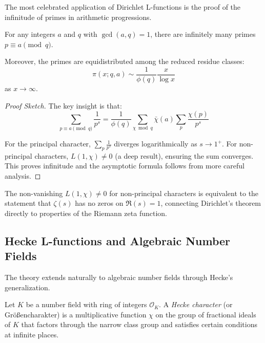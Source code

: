 The most celebrated application of Dirichlet L-functions is the proof of the infinitude of primes in arithmetic progressions.

\begin{theorem}
For any integers $a$ and $q$ with $\gcd(a,q) = 1$, there are infinitely many primes $p \equiv a \pmod{q}$.

Moreover, the primes are equidistributed among the reduced residue classes:
\begin{equation}
\pi(x; q, a) \sim \frac{1}{\phi(q)} \frac{x}{\log x}
\end{equation}
as $x \to \infty$.
\end{theorem}

\begin{proof}[Proof Sketch]
The key insight is that:
\begin{equation}
\sum_{p \equiv a \pmod{q}} \frac{1}{p^s} = \frac{1}{\phi(q)} \sum_{\chi \bmod q} \bar{\chi}(a) \sum_p \frac{\chi(p)}{p^s}
\end{equation}

For the principal character, $\sum_p \frac{1}{p^s}$ diverges logarithmically as $s \to 1^+$. For non-principal characters, $L(1,\chi) \neq 0$ (a deep result), ensuring the sum converges. This proves infinitude and the asymptotic formula follows from more careful analysis.
\end{proof}

\begin{remark}
The non-vanishing $L(1,\chi) \neq 0$ for non-principal characters is equivalent to the statement that $\zeta(s)$ has no zeros on $\Re(s) = 1$, connecting Dirichlet's theorem directly to properties of the Riemann zeta function.
\end{remark}

\subsection{Hecke L-functions and Algebraic Number Fields}

The theory extends naturally to algebraic number fields through Hecke's generalization.

\begin{definition}
Let $K$ be a number field with ring of integers $\mathcal{O}_K$. A \emph{Hecke character} (or Größencharakter) is a multiplicative function $\chi$ on the group of fractional ideals of $K$ that factors through the narrow class group and satisfies certain conditions at infinite places.
\end{definition}

